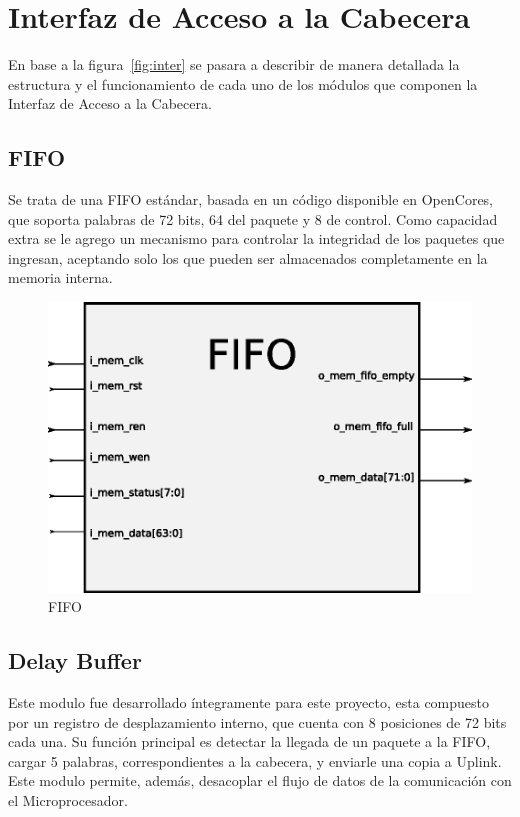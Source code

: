 \section{Interfaz de Acceso a la Cabecera}
En base a la figura~\ref{fig:inter} se pasara a describir de manera detallada la estructura y el funcionamiento de cada uno de los módulos que componen la Interfaz de Acceso a la Cabecera. 

\subsection{FIFO}
Se trata de una FIFO estándar, basada en un código disponible en OpenCores, que soporta palabras de 72 bits, 64 del paquete y 8 de control. Como capacidad extra se le agrego un mecanismo para controlar la integridad de los paquetes que ingresan, aceptando solo los que pueden ser almacenados completamente en la memoria interna. 

\begin{figure}[H]
  \centering
	\includegraphics[scale=0.60]{3-arquitectura/graf/bloqfifo.eps}
  \caption{FIFO}
  \label{fig:gen}
\end{figure}

\subsection{Delay Buffer}
Este modulo fue desarrollado íntegramente para este proyecto, esta compuesto por un registro de desplazamiento interno, que cuenta con 8 posiciones de 72 bits cada una. Su función principal es detectar la llegada de un paquete a la FIFO, cargar 5 palabras, correspondientes a la cabecera, y enviarle una copia a Uplink. Este modulo permite, además, desacoplar el flujo de datos de la comunicación con el Microprocesador.

